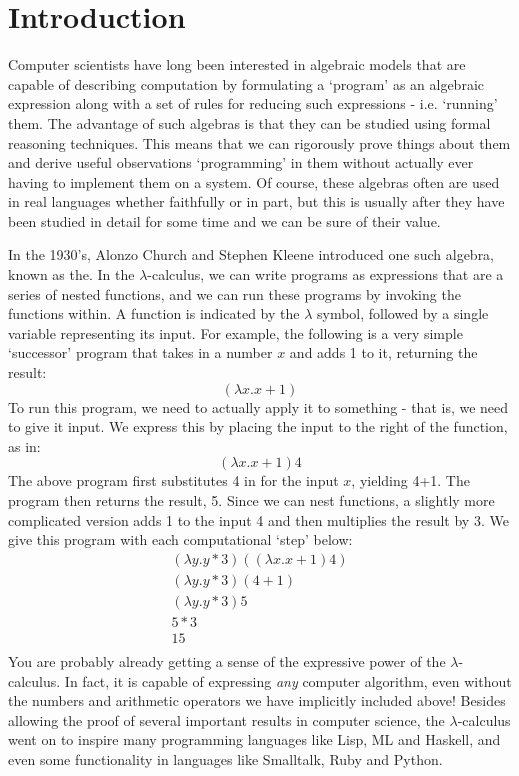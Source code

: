 \chapter{Introduction}\label{Introduction}
	Computer scientists have long been interested in algebraic models that are capable of describing computation by formulating a `program' as an algebraic expression along with a set of rules for reducing such expressions - i.e. `running' them.  
The advantage of such algebras is that they can be studied using formal reasoning techniques.  
This means that we can rigorously prove things about them and derive useful observations `programming' in them without actually ever having to implement them on a system.  
Of course, these algebras often are used in real languages whether faithfully or in part, but this is usually after they have been studied in detail for some time and we can be sure of their value.
	
	In the 1930's, Alonzo Church and Stephen Kleene introduced one such algebra, known as the.  
In the $\lambda$-calculus, we can write programs as expressions that are a series of nested functions, and we can run these programs by invoking the functions within.  
A function is indicated by the $\lambda$ symbol, followed by a single variable representing its input.  
For example, the following is a very simple `successor' program that takes in a number $x$ and adds 1 to it, returning the result:
	\[
		(\lambda x. x + 1)
	\]
To run this program, we need to actually apply it to something - that is, we need to give it input.  
We express this by placing the input to the right of the function, as in:
\[
	(\lambda x. x + 1) 4
\]
The above program first substitutes 4 in for the input $x$, yielding 4+1.  
The program then returns the result, 5.  
Since we can nest functions, a slightly more complicated version adds 1 to the input 4 and then multiplies the result by 3.  
We give this program with each computational `step' below:
\begin{align*}
	(\lambda y. y * 3) ((\lambda x. x + 1) 4)\\
	(\lambda y. y * 3) (4+1)\\
	(\lambda y. y * 3) 5\\
	5 * 3\\
	15\\
\end{align*}
You are probably already getting a sense of the expressive power of the $\lambda$-calculus.  
In fact, it is capable of expressing \emph{any} computer algorithm, even without the numbers and arithmetic operators we have implicitly included above!  Besides allowing the proof of several important results in computer science, the $\lambda$-calculus went on to inspire many programming languages like Lisp, ML and Haskell, and even some functionality in languages like Smalltalk, Ruby and Python.
